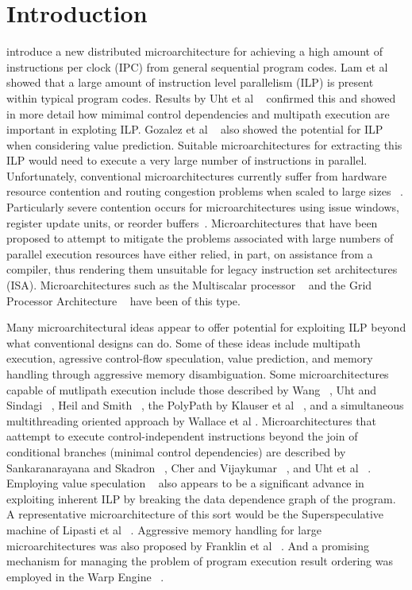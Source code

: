 \documentclass[10pt,twocolumn]{IEEEtran}
\begin{document}
\section{Introduction}
%
 introduce a new distributed microarchitecture for achieving
a high amount of instructions per clock (IPC) from general 
sequential program codes.
Lam et al ~\cite{Lam92} showed that a large amount of instruction
level parallelism (ILP) is present within typical program codes.
Results by Uht et al ~\cite{Uht95} confirmed this and showed in more detail
how mimimal control dependencies and multipath execution are
important in exploting ILP.
Gozalez et al ~\cite{Gon97,gonzalez98limits }
also showed the potential for ILP when considering value prediction.
Suitable microarchitectures for extracting this ILP would need to
execute a very large number of instructions in parallel.
Unfortunately, conventional microarchitectures currently suffer
from hardware resource contention and routing congestion problems when
scaled to large sizes ~\cite{Palacharla97}.  
Particularly severe contention occurs for 
microarchitectures using
issue windows,
register update units, or reorder buffers~\cite{Smith95,Bannon95,Kessler98}.
Microarchitectures that have been proposed to attempt to mitigate
the problems associated with large numbers of parallel execution
resources have either relied, in part, on assistance from a
compiler, thus rendering them unsuitable for legacy instruction
set architectures (ISA).  
Microarchitectures such as the Multiscalar 
processor ~\cite{Sohi95} and the Grid Processor Architecture ~\cite{Nag01} 
have been of this type.  

Many microarchitectural ideas appear to offer potential for
exploiting ILP beyond what conventional designs can do.
Some of these ideas include multipath execution,
agressive control-flow speculation, value prediction, and
memory handling through aggressive memory disambiguation.
Some microarchitectures capable of mutlipath
execution include those described by Wang ~\cite{Wang90}, 
Uht and Sindagi ~\cite{Uht95},
Heil and Smith ~\cite{Heil96},
the PolyPath by Klauser et al ~\cite{Klauser98},
and a simultaneous multithreading oriented approach by
Wallace et al \cite{Wallace98}. 
Microarchitectures that aattempt to 
execute control-independent instructions
beyond the join of conditional branches (minimal control
dependencies) are described by 
Sankaranarayana and Skadron ~\cite{Sank01a,Sank01b}, 
Cher and Vijaykumar ~\cite{Cher01}, and Uht et al ~\cite{Uht01}.
Employing
value speculation ~\cite{ lipasti96exceeding,lipasti97performance }
also appears to be a significant advance in exploiting inherent ILP
by breaking the data dependence graph of the program.
A representative microarchitecture of this sort would
be the Superspeculative machine of 
Lipasti et al ~\cite{lipasti97superspeculative}.
Aggressive memory handling for large microarchitectures
was also proposed by Franklin et al ~\cite{Franklin96}.
And a promising mechanism for managing the problem of program
execution result ordering was employed in the 
Warp Engine ~\cite{Cleary95}.
\end{document}
